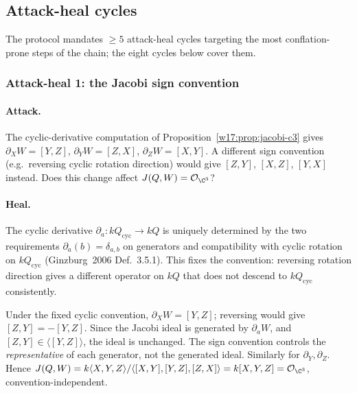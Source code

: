 \subsection{Attack-heal cycles}
\label{w17:subsec:attack-heal-cycles}

The protocol mandates $\geq 5$ attack-heal cycles targeting the most
conflation-prone steps of the chain; the eight cycles below cover them.

\subsubsection{Attack-heal 1: the Jacobi sign convention}
\label{w17:subsubsec:ah1-jacobi-sign}

\paragraph{Attack.}
The cyclic-derivative computation of Proposition~\ref{w17:prop:jacobi-c3} gives
$\partial_X W = [Y, Z]$, $\partial_Y W = [Z, X]$, $\partial_Z W = [X, Y]$.
A different sign convention (e.g.\ reversing cyclic rotation direction) would
give $[Z, Y]$, $[X, Z]$, $[Y, X]$ instead. Does this change affect
$\Jac(Q, W) = \mathcal{O}_{\C^3}$?

\paragraph{Heal.}
The cyclic derivative $\partial_a: kQ_{\mathrm{cyc}} \to kQ$ is uniquely determined
by the two requirements $\partial_a(b) = \delta_{a, b}$ on generators and
compatibility with cyclic rotation on $kQ_{\mathrm{cyc}}$ (Ginzburg~2006
Def.~3.5.1). This fixes the convention: reversing rotation direction gives a
different operator on $kQ$ that does not descend to $kQ_{\mathrm{cyc}}$ consistently.

Under the fixed cyclic convention, $\partial_X W = [Y, Z]$; reversing would
give $[Z, Y] = -[Y, Z]$. Since the Jacobi ideal is generated by $\partial_a W$,
and $[Z, Y] \in \langle [Y, Z]\rangle$, the ideal is unchanged. The sign
convention controls the \emph{representative} of each generator, not the
generated ideal. Similarly for $\partial_Y, \partial_Z$. Hence
$\Jac(Q, W) = k\langle X, Y, Z\rangle / \langle [X, Y], [Y, Z], [Z, X]\rangle
= k[X, Y, Z] = \mathcal{O}_{\C^3}$, convention-independent.


